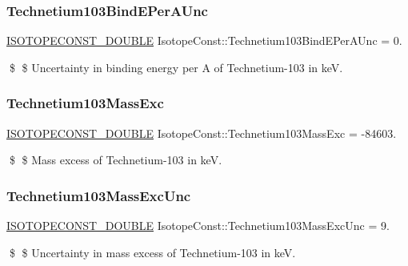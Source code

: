 \subsubsection{\texorpdfstring{Technetium103\+Bind\+E\+Per\+A\+Unc}{Technetium103BindEPerAUnc}}
{\footnotesize\ttfamily \mbox{\hyperlink{group___isotope_const-_macros_ga8f45a7272ce02c0b4c65c44636ed719a}{I\+S\+O\+T\+O\+P\+E\+C\+O\+N\+S\+T\+\_\+\+D\+O\+U\+B\+LE}} Isotope\+Const\+::\+Technetium103\+Bind\+E\+Per\+A\+Unc = 0.}

\$ \$ Uncertainty in binding energy per A of Technetium-\/103 in keV. \mbox{\label{group___isotope_const-_technetium-_tc103_gaa528c90070e24d6ef76565c518852f37}} 
\subsubsection{\texorpdfstring{Technetium103\+Mass\+Exc}{Technetium103MassExc}}
{\footnotesize\ttfamily \mbox{\hyperlink{group___isotope_const-_macros_ga8f45a7272ce02c0b4c65c44636ed719a}{I\+S\+O\+T\+O\+P\+E\+C\+O\+N\+S\+T\+\_\+\+D\+O\+U\+B\+LE}} Isotope\+Const\+::\+Technetium103\+Mass\+Exc = -\/84603.}

\$ \$ Mass excess of Technetium-\/103 in keV. \mbox{\label{group___isotope_const-_technetium-_tc103_ga6d790103b1b7b12ea16a2e0dec85a652}} 
\subsubsection{\texorpdfstring{Technetium103\+Mass\+Exc\+Unc}{Technetium103MassExcUnc}}
{\footnotesize\ttfamily \mbox{\hyperlink{group___isotope_const-_macros_ga8f45a7272ce02c0b4c65c44636ed719a}{I\+S\+O\+T\+O\+P\+E\+C\+O\+N\+S\+T\+\_\+\+D\+O\+U\+B\+LE}} Isotope\+Const\+::\+Technetium103\+Mass\+Exc\+Unc = 9.}

\$ \$ Uncertainty in mass excess of Technetium-\/103 in keV. \mbox{\label{group___isotope_const-_technetium-_tc103_gabfb15286bf310d6f90afd837999bf77a}} 
